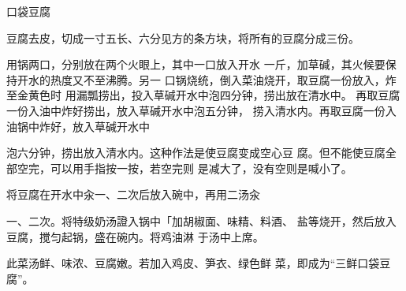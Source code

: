 \begin{recipe}{口袋豆腐}

\ingredients



\cooking

\step 豆腐去皮，切成一寸五长、六分见方的条方块，将所有的豆腐分成三份。

用锅两口，分别放在两个火眼上，其中一口放入开水 一斤，加草碱，其火候要保持开水的热度又不至沸腾。另一 口锅烧统，倒入菜油烧开，取豆腐一份放入，炸至金黄色时 用漏瓢捞出，投入草碱开水中泡四分钟，捞出放在清水中。 再取豆腐一份入油中炸好捞出，放入草碱开水中泡五分钟， 捞入清水内。再取豆腐一份入油锅中炸好，放入草碱开水中

泡六分钟，捞出放入清水内。这种作法是使豆腐变成空心豆 腐。但不能使豆腐全部空完，可以用手指按一按，若空完则 是减大了，没有空则是喊小了。

将豆腐在开水中汆一、二次后放入碗中，再用二汤汆

一、二次。将特级奶汤證入锅中「加胡椒面、味精、料酒、 盐等烧开，然后放入豆腐，搅匀起锅，盛在碗内。将鸡油淋 于汤中上席。

\notes

此菜汤鲜、味浓、豆腐嫩。若加入鸡皮、笋衣、绿色鲜 菜，即成为“三鲜口袋豆腐”。

\end{recipe}

